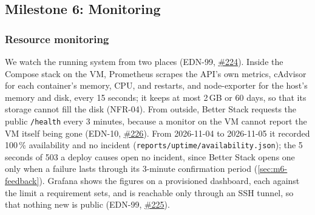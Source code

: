 \subsection{Milestone 6: Monitoring}
\label{sec:m6}

\subsubsection{Resource monitoring}
\label{sec:m6-resources}

We watch the running system from two places (EDN-99, \href{https://github.com/mlops-2627q1-mds-upc/MLOPS_Recommenditos/issues/224}{\#224}).
Inside the Compose stack on the VM, Prometheus scrapes the API's own metrics, cAdvisor for each container's memory, CPU, and restarts, and node-exporter for the host's memory and disk, every 15 seconds; it keeps at most 2\,GB or 60 days, so that its storage cannot fill the disk (NFR-04).
From outside, Better Stack requests the public \texttt{/health} every 3 minutes, because a monitor on the VM cannot report the VM itself being gone (EDN-10, \href{https://github.com/mlops-2627q1-mds-upc/MLOPS_Recommenditos/issues/226}{\#226}).
From 2026-11-04 to 2026-11-05 it recorded 100\,\% availability and no incident (\texttt{reports/\allowbreak uptime/\allowbreak availability.json}); the 5 seconds of 503 a deploy causes open no incident, since Better Stack opens one only when a failure lasts through its 3-minute confirmation period (\cref{sec:m6-feedback}).
Grafana shows the figures on a provisioned dashboard, each against the limit a requirement sets, and is reachable only through an SSH tunnel, so that nothing new is public (EDN-99, \href{https://github.com/mlops-2627q1-mds-upc/MLOPS_Recommenditos/issues/225}{\#225}).

